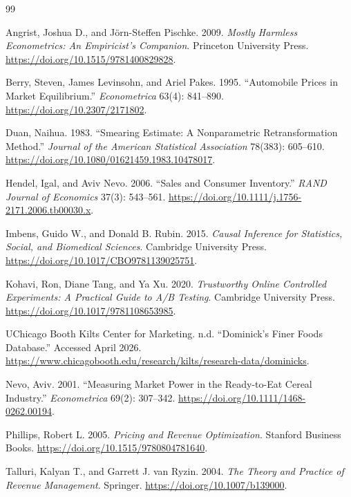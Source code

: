 \documentclass[11pt]{article}
\begin{document}
\begin{thebibliography}{99}

Angrist, Joshua D., and Jörn-Steffen Pischke. 2009.
\textit{Mostly Harmless Econometrics: An Empiricist's Companion}.
Princeton University Press.
\url{https://doi.org/10.1515/9781400829828}.

Berry, Steven, James Levinsohn, and Ariel Pakes. 1995.
``Automobile Prices in Market Equilibrium.''
\textit{Econometrica} 63(4): 841--890.
\url{https://doi.org/10.2307/2171802}.

Duan, Naihua. 1983.
``Smearing Estimate: A Nonparametric Retransformation Method.''
\textit{Journal of the American Statistical Association} 78(383): 605--610.
\url{https://doi.org/10.1080/01621459.1983.10478017}.

Hendel, Igal, and Aviv Nevo. 2006.
``Sales and Consumer Inventory.''
\textit{RAND Journal of Economics} 37(3): 543--561.
\url{https://doi.org/10.1111/j.1756-2171.2006.tb00030.x}.

Imbens, Guido W., and Donald B. Rubin. 2015.
\textit{Causal Inference for Statistics, Social, and Biomedical Sciences}.
Cambridge University Press.
\url{https://doi.org/10.1017/CBO9781139025751}.

Kohavi, Ron, Diane Tang, and Ya Xu. 2020.
\textit{Trustworthy Online Controlled Experiments: A Practical Guide to A/B Testing}.
Cambridge University Press.
\url{https://doi.org/10.1017/9781108653985}.

UChicago Booth Kilts Center for Marketing. n.d.
``Dominick's Finer Foods Database.''
Accessed April 2026.
\url{https://www.chicagobooth.edu/research/kilts/research-data/dominicks}.

Nevo, Aviv. 2001.
``Measuring Market Power in the Ready-to-Eat Cereal Industry.''
\textit{Econometrica} 69(2): 307--342.
\url{https://doi.org/10.1111/1468-0262.00194}.

Phillips, Robert L. 2005.
\textit{Pricing and Revenue Optimization}.
Stanford Business Books.
\url{https://doi.org/10.1515/9780804781640}.

Talluri, Kalyan T., and Garrett J. van Ryzin. 2004.
\textit{The Theory and Practice of Revenue Management}.
Springer.
\url{https://doi.org/10.1007/b139000}.

\end{thebibliography}
\end{document}
